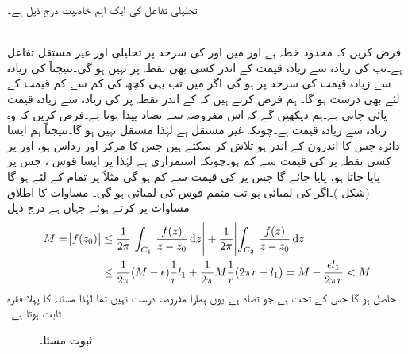 تحلیلی تفاعل کی ایک اہم خاصیت درج ذیل ہے۔

\quad {}\\
فرض کریں کہ  محدود خطہ ہے اور  میں اور  کی سرحد  پر  تحلیلی اور غیر مستقل  تفاعل ہے۔تب   کی زیادہ سے زیادہ قیمت  کے اندر کسی بھی نقطہ پر نہیں ہو گی۔نتیجتاً  کی زیادہ سے زیادہ قیمت  کی سرحد پر ہو گی۔اگر  میں  تب یہی کچھ  کی کم سے کم قیمت کے لئے بھی درست ہو گا۔
\quad
ہم فرض کرتے ہیں کہ  کے اندر نقطہ  پر  کی زیادہ سے زیادہ قیمت پائی جاتی ہے۔ہم دیکھیں گے کہ اس مفروضہ سے تضاد پیدا ہوتا ہے۔فرض کریں کہ وہ زیادہ سے زیادہ قیمت  ہے۔چونکہ  غیر مستقل ہے لہٰذا  مستقل نہیں ہو گا۔نتیجتاً ہم  ایسا دائرہ  جس کا اندرون  کے اندر  ہو تلاش کر سکتے ہیں جس کا مرکز  اور رداس  ہو، اور  پر کسی نقطہ  پر  کی قیمت  سے کم ہو۔چونکہ  استمراری ہے لہٰذا   پر ایسا قوس ، جس پر  پایا جاتا ہو، پایا جائے گا جس پر  کی قیمت  سے کم ہو گی مثلاً  پر تمام  کے لئے  ہو گا (شکل )۔اگر  کی لمبائی  ہو تب متمم قوس  کی لمبائی  ہو گی۔ مساوات  کا اطلاق مساوات  پر کرتے ہوئے جہاں  ہے درج ذیل
\begin{align*}
M=\abs{f(z_0)}&\le \frac{1}{2\pi} \abs{\int_{C_1}\, \frac{f(z)}{z-z_0}\dif z}+\frac{1}{2\pi}\abs{\int_{C_2}\,\frac{f(z)}{z-z_0}\dif z}\\
&\le \frac{1}{2\pi}(M-\epsilon)\frac{1}{r}l_1+\frac{1}{2\pi} M\frac{1}{r}(2\pi r-l_1)=M-\frac{\epsilon l_1}{2\pi r}<M
\end{align*}
حاصل ہو گا  جس کے تحت  ہے جو تضاد ہے۔یوں ہمارا مفروضہ درست نہیں تھا لہٰذا مسئلہ کا پہلا فقرہ ثابت ہوتا ہے۔
\begin{figure}
\centering
{}
\caption{ثبوت مسئلہ }
\label{شکل_مسئلہ_مخفی_قوہ_بلند_تر_سرحد_پر}
\end{figure} 

